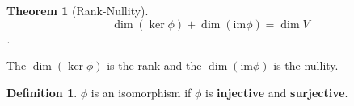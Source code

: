\documentclass[12pt, a4paper, openany]{report}
\newtheorem{thm}{Theorem}
\theoremstyle{definition}
\newtheorem{defn}{Definition}
\theoremstyle{remark}
\begin{document}
\begin{thm}[Rank-Nullity]
    \[ \dim ( \ker \phi ) + \dim ( \mathrm{im} \phi ) = \dim V \].
\end{thm}
The \( \dim ( \ker \phi) \) is the rank and the \( \dim (\mathrm{im} \phi) \) is the nullity.

\begin{defn}
    \( \phi \) is an isomorphism if \( \phi \) is \textbf{injective} and \textbf{surjective}.

\end{defn}
\end{document}
